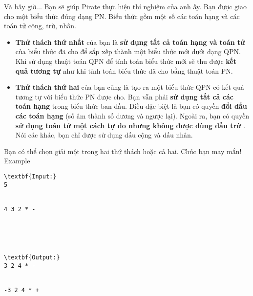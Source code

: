 Và bây giờ...
Bạn sẽ giúp Pirate thực hiện thí nghiệm của anh ấy. Bạn được giao cho một biểu thức đúng dạng PN. Biểu thức gồm một số các toán hạng và các toán tử cộng, trừ, nhân.  
\begin{itemize}
	\item \textbf{      Thử thách thứ nhất     }    của bạn là    \textbf{      sử dụng tất cả toán hạng và toán tử}    của biểu thức đã cho để sắp xếp thành một biểu thức mới dưới dạng QPN. Khi sử dụng thuật toán QPN để tính toán biểu thức mới sẽ thu được    \textbf{     kết quả tương tự    }    như khi tính toán biểu thức đã cho bằng thuật toán PN.   
	\item \textbf{      Thử thách thứ hai     }    của bạn cũng là tạo ra một biểu thức QPN có kết quả tương tự với biểu thức PN được cho. Bạn vẫn phải    \textbf{sử dụng tất cả các toán hạng}    trong biểu thức ban đầu. Điều đặc biệt là bạn có quyền    \textbf{đổi dấu các toán hạng}    (số âm thành số dương và ngược lại). Ngoài ra, bạn có quyền    \textbf{sử dụng toán tử một cách tự do nhưng không được dùng dấu trừ}    . Nói các khác, bạn chỉ được sử dụng dấu cộng và dấu nhân.   
\end{itemize}

   Bạn có thể chọn giải một trong hai thứ thách hoặc cả hai. Chúc bạn may mắn!
Example
\begin{verbatim}
\textbf{Input:}
5


4 3 2 * -





\textbf{Output:}
3 2 4 * -


-3 2 4 * + \end{verbatim}

